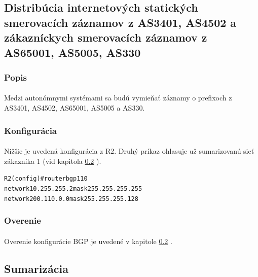 \documentclass[12pt,twoside,a4paper]{report}
\begin{document}
\subsection{Distribúcia internetových statických smerovacích záznamov z AS3401, AS4502 a zákazníckych smerovacích záznamov z AS65001, AS5005, AS330}
\subsubsection{Popis}
\paragraph{}
Medzi autonómnymi systémami sa budú vymieňať záznamy o prefixoch z AS3401, AS4502, AS65001, AS5005 a AS330.

\subsubsection{Konfigurácia}
\paragraph{}
Nižšie je uvedená konfigurácia z R2. Druhý príkaz  ohlasuje už sumarizovanú sieť zákazníka 1 (viď kapitola \ref{sumarizacia} ).

\noindent
{\selectfont
\begin{small}
\begin{alltt}
R2(config)#router bgp 110
  network 10.255.255.2 mask 255.255.255.255
  network 200.110.0.0 mask 255.255.255.128
\end{alltt}
\end{small}
}

\subsubsection{Overenie}
\paragraph{}
Overenie konfigurácie BGP je uvedené v kapitole \ref{sumarizacia} .









\subsection{Sumarizácia}
\label{sumarizacia}
\end{document}
